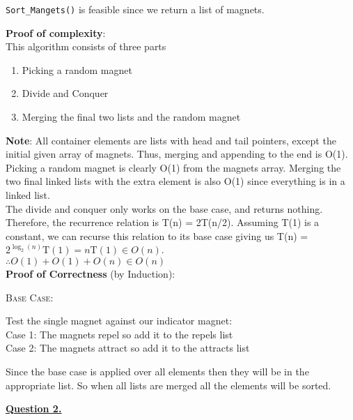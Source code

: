 \documentclass[12pt]{article}
\begin{document}
\texttt{Sort\_Mangets()} is feasible since we return a list of magnets.

\newpage
\textbf{Proof of complexity}:\\
This algorithm consists of three parts
\begin{enumerate}
	\itemsep0em
	\item Picking a random magnet
	\item Divide and Conquer
	\item Merging the final two lists and the random magnet
\end{enumerate}
\textbf{Note}: All container elements are lists with head and tail pointers, except the initial given array of magnets.
Thus, merging and appending to the end is O(1).\\

Picking a random magnet is clearly O(1) from the magnets array.
Merging the two final linked lists with the extra element is also O(1) since everything is in a linked list.\\

The divide and conquer only works on the base case, and returns nothing. Therefore, the recurrence relation is T(n) = 2T(n/2).
Assuming T(1) is a constant, we can recurse this relation to its base case giving us T(n) = $2^{\log_2(n)}\text{T}(1) = n\text{T}(1) \in O(n)$.\\

$\therefore O(1) + O(1) + O(n) \in O(n)$\\

\textbf{Proof of Correctness} (by Induction):
\begin{adjustwidth}{10mm}{}
	\textsc{Base Case}:
	\begin{adjustwidth}{10mm}{}
		Test the single magnet against our indicator magnet:\\
		Case 1: The magnets repel so add it to the repels list\\
		Case 2: The magnets attract so add it to the attracts list\\
	\end{adjustwidth}

	Since the base case is applied over all elements then they will be in the appropriate list. So when all lists are merged all the elements will be sorted.
\end{adjustwidth}
\newpage
\hyperlink{toc}{\hypertarget{2}{\LARGE \underline{\textbf{Question 2.}}}}\\
\end{document}
